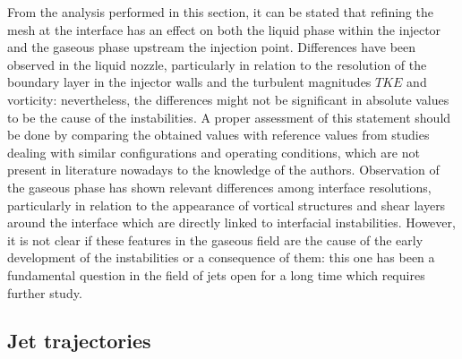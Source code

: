From the analysis performed in this section, it can be stated that refining the mesh at the interface has an effect on both the liquid phase within the injector and the gaseous phase upstream the injection point. Differences have been observed in the liquid nozzle, particularly in relation to the resolution of the boundary layer in the injector walls and the turbulent magnitudes $TKE$ and vorticity: nevertheless, the differences might not be significant in absolute values to be the cause of the instabilities. A proper assessment of this statement should be done by comparing the obtained values with reference values from studies dealing with similar configurations and operating conditions, which are not present in literature nowadays to the knowledge of the authors. Observation of the gaseous phase has shown relevant differences among interface resolutions, particularly in relation to the appearance of vortical structures and shear layers around the interface which are directly linked to interfacial instabilities. However, it is not clear if these features in the gaseous field are the cause of the early development of the instabilities or a consequence of them: this one has been a fundamental question in the field of jets open for a long time  which requires further study. %










\subsection{Jet trajectories}
\label{subsec:ch5_jet_trajectories_results}

